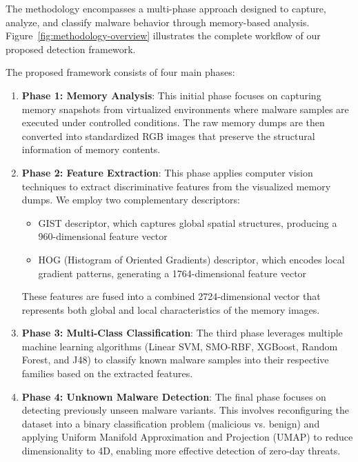 The methodology encompasses a multi-phase approach designed to capture, analyze, and classify malware behavior through memory-based analysis. Figure~\ref{fig:methodology-overview} illustrates the complete workflow of our proposed detection framework.

The proposed framework consists of four main phases:

\begin{enumerate}
    \item \textbf{Phase 1: Memory Analysis}: This initial phase focuses on capturing memory snapshots from virtualized environments where malware samples are executed under controlled conditions. The raw memory dumps are then converted into standardized RGB images that preserve the structural information of memory contents.
    
    \item \textbf{Phase 2: Feature Extraction}: This phase applies computer vision techniques to extract discriminative features from the visualized memory dumps. We employ two complementary descriptors:
    \begin{itemize}
        \item GIST descriptor, which captures global spatial structures, producing a 960-dimensional feature vector
        \item HOG (Histogram of Oriented Gradients) descriptor, which encodes local gradient patterns, generating a 1764-dimensional feature vector
    \end{itemize}
    These features are fused into a combined 2724-dimensional vector that represents both global and local characteristics of the memory images.
    
    \item \textbf{Phase 3: Multi-Class Classification}: The third phase leverages multiple machine learning algorithms (Linear SVM, SMO-RBF, XGBoost, Random Forest, and J48) to classify known malware samples into their respective families based on the extracted features.
    
    \item \textbf{Phase 4: Unknown Malware Detection}: The final phase focuses on detecting previously unseen malware variants. This involves reconfiguring the dataset into a binary classification problem (malicious vs. benign) and applying Uniform Manifold Approximation and Projection (UMAP) to reduce dimensionality to 4D, enabling more effective detection of zero-day threats.
\end{enumerate}

